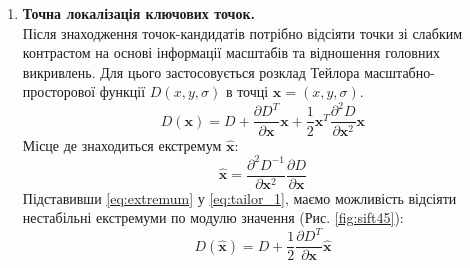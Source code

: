\begin{enumerate}
    \item \textbf{Точна локалізація ключових точок.} \\
          Після знаходження точок-кандидатів потрібно відсіяти точки зі слабким контрастом на основі
          інформації масштабів та відношення головних викривлень. Для цього застосовується розклад
          Тейлора масштабно-просторової функції $D(x,y,\sigma)$ в точці $\textbf{x} = (x,y,\sigma)$.
          \begin{equation}
              D(\textbf{x}) = D + \frac{\partial D^T }{\partial \textbf{x} }\textbf{x} +
              \frac{1}{2}\textbf{x}^T\frac{\partial^2 D}{\partial \textbf{x}^2}\textbf{x}
              \label{eq:tailor_1}
          \end{equation}
          Місце де знаходиться екстремум $\widehat{\textbf{x}}$:
          \begin{equation}
              \widehat{\textbf{x}} = \frac{\partial^2 D^{-1} }{\partial
                  \textbf{x}^2}\frac{\partial D }{\partial \textbf{x}}
              \label{eq:extremum}
          \end{equation}
          Підставивши \ref{eq:extremum} у  \ref{eq:tailor_1}, маємо можливість відсіяти нестабільні
          екстремуми по модулю значення (Рис. \ref{fig:sift45}):
          \begin{equation*}
              D(\widehat{\textbf{x}}) = D + \frac{1}{2}\frac{\partial D^{T} }{\partial \textbf{x}}\widehat{\textbf{x}}
          \end{equation*}


\end{enumerate}
